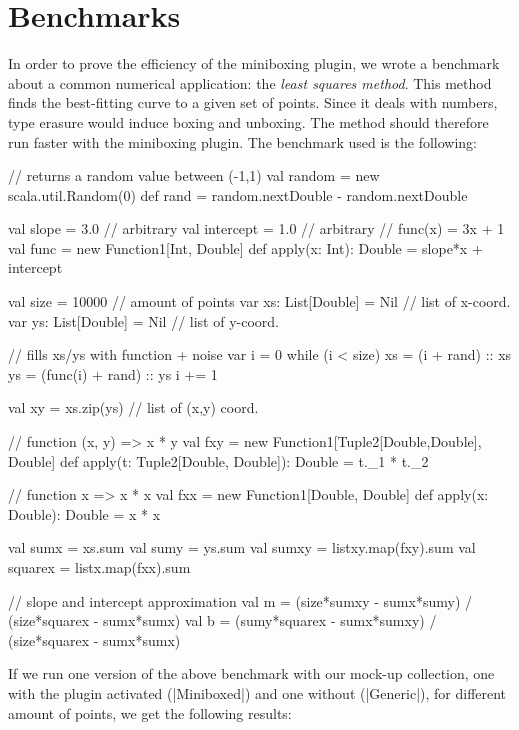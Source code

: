 \section{Benchmarks}

In order to prove the efficiency of the miniboxing plugin, we wrote a benchmark about a common numerical application: the \textit{least squares method}. This method finds the best-fitting curve to a given set of points. Since it deals with numbers, type erasure would induce boxing and unboxing. The method should therefore run faster with the miniboxing plugin. The benchmark used is the following:

\begin{lstlisting-nobreak}
 // returns a random value between (-1,1)
 val random = new scala.util.Random(0)
 def rand = random.nextDouble - random.nextDouble
 
 val slope = 3.0  // arbitrary
 val intercept = 1.0  // arbitrary
 // func(x) = 3x + 1
 val func = new Function1[Int, Double] {
   def apply(x: Int): Double =
      slope*x + intercept
 }
 
 val size = 10000 // amount of points
 var xs: List[Double] = Nil // list of x-coord.
 var ys: List[Double] = Nil // list of y-coord.
 
 // fills xs/ys with function + noise
 var i = 0
 while (i < size) {
  xs = (i + rand) :: xs
  ys = (func(i) + rand) :: ys
  i += 1
 }
 
 val xy = xs.zip(ys) // list of (x,y) coord.
 
  // function (x, y) => x * y
 val fxy =
  new Function1[Tuple2[Double,Double], Double] {
     def apply(t: Tuple2[Double, Double]): Double = t._1 * t._2
 }
 
 // function x => x * x
 val fxx = new Function1[Double, Double] {
   def apply(x: Double): Double = x * x
 }
 
 val sumx  = xs.sum
 val sumy  = ys.sum
 val sumxy = listxy.map(fxy).sum
 val squarex = listx.map(fxx).sum
 
 // slope and intercept approximation
 val m = (size*sumxy - sumx*sumy) / (size*squarex - sumx*sumx)
 val b = (sumy*squarex - sumx*sumxy) / (size*squarex - sumx*sumx)
\end{lstlisting-nobreak}
%  

If we run one version of the above benchmark with our mock-up collection, one with the plugin activated (|Miniboxed|) and one without (|Generic|), for different amount of points, we get the following results:


